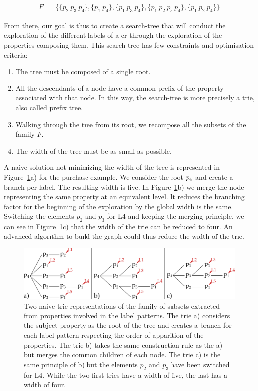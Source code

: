 \begin{align*}
 F\ =\ \{\{p_2\ p_3\ p_4\},
\{p_1\ p_4\},
\{p_1\ p_3\ p_4\},
\{p_1\ p_2\ p_3\ p_4\},
\{p_1\ p_2\ p_4\}\}
\end{align*}

From there, our goal is thus to create a search-tree that will conduct the exploration of the different labels of a \acrshort{cr} through the exploration of the properties composing them. This search-tree has few constraints and optimisation criteria:

\newpage

\begin{enumerate}
	\item The tree must be composed of a single root.
	\item All the descendants of a node have a common prefix of the property associated with that node. In this way, the search-tree is more precisely a trie, also called prefix tree.
	\item Walking through the tree from its root, we recompose all the subsets of the family $F$.
	\item The width of the tree must be as small as possible.
\end{enumerate}

A naive solution not minimizing the width of the tree is represented in Figure~\ref{fig:chap7_naive}a) for the purchase example. We consider the root $p_4$ and create a branch per label. The resulting width is five. In Figure~\ref{fig:chap7_naive}b) we merge the node representing the same property at an equivalent level. It reduces the branching factor for the beginning of the exploration by the global width is the same. Switching the elements $p_2$ and $p_3$ for L4 and keeping the merging principle, we can see in Figure~\ref{fig:chap7_naive}c) that the width of the trie can be reduced to four. An advanced algorithm to build the graph could thus reduce the width of the trie.

\begin{figure}[ht!]
\centering
\includegraphics[width=\textwidth]{figures/chapter7/naive.png}
\caption{\label{fig:chap7_naive} Two naive trie representations of the family of subsets extracted from properties involved in the label patterns. The trie a) considers the subject property as the root of the tree and creates a branch for each label pattern respecting the order of apparition of the properties. The trie b) takes the same construction rule as the a) but merges the common children of each node. The trie c) is the same principle of b) but the elements $p_2$ and $p_3$ have been switched for L4. While the two first tries have a width of five, the last has a width of four.}
\end{figure}

